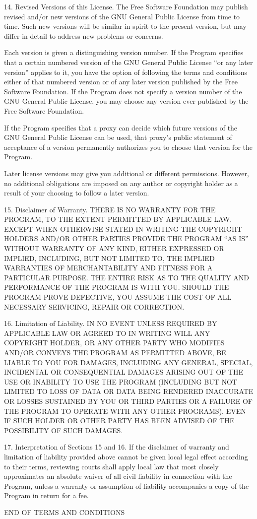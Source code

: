 14. Revised Versions of this License.
The Free Software Foundation may publish revised and/or new versions of the GNU General Public License from time to time. Such new versions will be similar in spirit to the present version, but may differ in detail to address new problems or concerns.

Each version is given a distinguishing version number. If the Program specifies that a certain numbered version of the GNU General Public License “or any later version” applies to it, you have the option of following the terms and conditions either of that numbered version or of any later version published by the Free Software Foundation. If the Program does not specify a version number of the GNU General Public License, you may choose any version ever published by the Free Software Foundation.

If the Program specifies that a proxy can decide which future versions of the GNU General Public License can be used, that proxy's public statement of acceptance of a version permanently authorizes you to choose that version for the Program.

Later license versions may give you additional or different permissions. However, no additional obligations are imposed on any author or copyright holder as a result of your choosing to follow a later version.

15. Disclaimer of Warranty.
THERE IS NO WARRANTY FOR THE PROGRAM, TO THE EXTENT PERMITTED BY APPLICABLE LAW. EXCEPT WHEN OTHERWISE STATED IN WRITING THE COPYRIGHT HOLDERS AND/OR OTHER PARTIES PROVIDE THE PROGRAM “AS IS” WITHOUT WARRANTY OF ANY KIND, EITHER EXPRESSED OR IMPLIED, INCLUDING, BUT NOT LIMITED TO, THE IMPLIED WARRANTIES OF MERCHANTABILITY AND FITNESS FOR A PARTICULAR PURPOSE. THE ENTIRE RISK AS TO THE QUALITY AND PERFORMANCE OF THE PROGRAM IS WITH YOU. SHOULD THE PROGRAM PROVE DEFECTIVE, YOU ASSUME THE COST OF ALL NECESSARY SERVICING, REPAIR OR CORRECTION.

16. Limitation of Liability.
IN NO EVENT UNLESS REQUIRED BY APPLICABLE LAW OR AGREED TO IN WRITING WILL ANY COPYRIGHT HOLDER, OR ANY OTHER PARTY WHO MODIFIES AND/OR CONVEYS THE PROGRAM AS PERMITTED ABOVE, BE LIABLE TO YOU FOR DAMAGES, INCLUDING ANY GENERAL, SPECIAL, INCIDENTAL OR CONSEQUENTIAL DAMAGES ARISING OUT OF THE USE OR INABILITY TO USE THE PROGRAM (INCLUDING BUT NOT LIMITED TO LOSS OF DATA OR DATA BEING RENDERED INACCURATE OR LOSSES SUSTAINED BY YOU OR THIRD PARTIES OR A FAILURE OF THE PROGRAM TO OPERATE WITH ANY OTHER PROGRAMS), EVEN IF SUCH HOLDER OR OTHER PARTY HAS BEEN ADVISED OF THE POSSIBILITY OF SUCH DAMAGES.

17. Interpretation of Sections 15 and 16.
If the disclaimer of warranty and limitation of liability provided above cannot be given local legal effect according to their terms, reviewing courts shall apply local law that most closely approximates an absolute waiver of all civil liability in connection with the Program, unless a warranty or assumption of liability accompanies a copy of the Program in return for a fee.

END OF TERMS AND CONDITIONS
